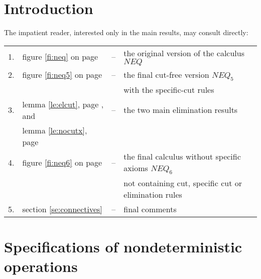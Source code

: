 \section{Introduction}

The impatient reader, interested only in the main results, may consult directly:\\
\begin{tabular}{rlcl}
1. &  figure \ref{fi:neq} on page \pageref{fi:neq} & -- & the original version of
the calculus $NEQ$ \\
2. & figure \ref{fi:neq5} on page \pageref{fi:neq5} & -- & the final cut-free
version $NEQ_5$ \\
 & & & with the specific-cut rules \\
3. & lemma \ref{le:elcut}, page \pageref{le:elcut}, and & -- & the two main elimination results \\
 & lemma \ref{le:nocutx}, page \pageref{le:nocutx} \\
4. & figure \ref{fi:neq6} on page \pageref{fi:neq6} & -- & the final calculus
without specific axioms $NEQ_6$ \\ 
 & & & not containing cut, specific cut or elimination rules \\
5. & section \ref{se:connectives} & -- & final comments
\end{tabular}

\section{Specifications of nondeterministic operations}

